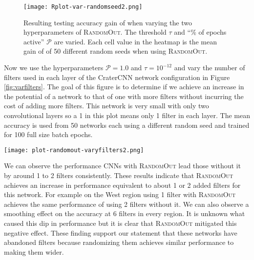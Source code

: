\documentclass{article}
\begin{document}
\begin{figure}
    \centering
    \texttt{[image: Rplot-var-randomseed2.png]}
    \caption{Resulting testing accuracy gain of when varying the two hyperparameters of \textsc{RandomOut}. The threshold $\tau$ and ``\%
     of epochs active'' $\mathcal{P}$ are varied. Each cell value in the heatmap is the mean gain of of 50 different random seeds when using \textsc{RandomOut}.}
    \label{fig:var}
\end{figure}


Now we use the hyperparameters $\mathcal{P} = 1.0$ and $\tau = 10^{-12}$ and vary the number of filters used in each layer of the CraterCNN network configuration in Figure \ref{fig:varfilters}. The goal of this figure is to determine if we achieve an increase in the potential of a network to that of one with more filters without incurring the cost of adding more filters. This network is very small with only two convolutional layers so a 1 in this plot means only 1 filter in each layer. The mean accuracy is used from 50 networks each using a different random seed and trained for 100 full size batch epochs. 

\begin{figure*}
    \centering
    \texttt{[image: plot-randomout-varyfilters2.png]}
    \caption{Here the number of filters used in the network is varied between 1 to 10 with and without \textsc{RandomOut} enabled. This plot shows the mean accuracy score from 50 different random seeds of CNNs with \textsc{RandomOut} lead those without it by around 1 to 2 filters consistently. This means the \textsc{RandomOut} method enables CNNs to increase their accuracy to that of a network containing more filters but without the computational cost of actually adding more filters.}
    \label{fig:varfilters}
\end{figure*}

We can observe the performance CNNs with \textsc{RandomOut} lead those without it by around 1 to 2 filters consistently. These results indicate that \textsc{RandomOut} achieves an increase in performance equivalent to about 1 or 2 added filters for this network. For example on the West region using 1 filter with \textsc{RandomOut} achieves the same performance of using 2 filters without it. We can also observe a smoothing effect on the accuracy at 6 filters in every region. It is unknown what caused this dip in performance but it is clear that \textsc{RandomOut} mitigated this negative effect. These finding support our statement that these networks have abandoned filters because randomizing them achieves similar performance to making them wider. 
\end{document}
